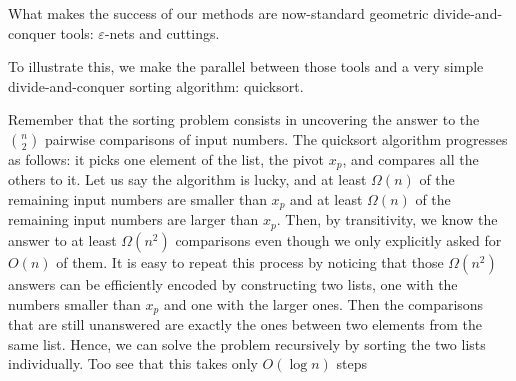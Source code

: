 
What makes the success of our methods are now-standard geometric
divide-and-conquer tools: \(\varepsilon\)-nets and cuttings.

To illustrate this, we make the parallel between those tools and
a very simple divide-and-conquer sorting algorithm: quicksort.

Remember that the sorting problem consists in uncovering the answer to the
\(n \choose 2\) pairwise comparisons of input numbers.
The quicksort algorithm progresses as follows: it picks one element of the
list, the pivot \(x_p\), and compares all the others to it. Let us say the algorithm is
lucky, and at least \(\Omega(n)\) of the remaining input numbers are
smaller than
\(x_p\)
and at least \(\Omega(n)\) of the remaining input numbers are larger than
\(x_p\). Then, by transitivity, we know the answer to at least
\(\Omega(n^2)\) comparisons
even though we only explicitly asked for \(O(n)\) of them. It is easy to repeat
this process by noticing that those \(\Omega(n^2)\) answers can be efficiently encoded by
constructing two lists, one with the numbers smaller than \(x_p\) and one with
the larger ones. Then the comparisons that are still unanswered are exactly the
ones between two elements from the same list. Hence, we can solve the problem
recursively by sorting the two lists individually.
Too see that this takes only \(O(\log n)\) steps


